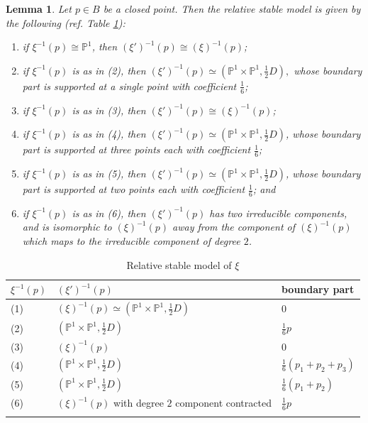 \documentclass[a4paper,12pt]{amsart}
\newcommand{\bP}{{\mathbb P}}
\newtheorem{lemma}[theorem]{Lemma}
\theoremstyle{definition}
\theoremstyle{remark}
\begin{document}
\begin{lemma}\label{lemma_objects_in_the_boundary_when_fibers_have_coef_1_over_18}
    Let $p\in B$ be a closed point. Then the relative stable model is given by the following \textup{(ref. Table \ref{table:Relative stable model})}:
    \begin{enumerate}
        \item if $\xi^{-1}(p)\cong \bP^1$, then $(\xi')^{-1}(p)\cong (\xi)^{-1}(p)$;
        \item if $\xi^{-1}(p)$ is as in (2), then $(\xi')^{-1}(p)\simeq (\bP^1\times \bP^1,\frac{1}{2}D),$ whose boundary part is supported at a single point with coefficient $\frac{1}{6}$;
        \item if $\xi^{-1}(p)$ is as in  (3), then $(\xi')^{-1}(p)\cong (\xi)^{-1}(p)$;
        \item if $\xi^{-1}(p)$ is as in  (4), then $(\xi')^{-1}(p)\simeq (\bP^1\times \bP^1,\frac{1}{2}D)$, whose boundary part is supported at three points each with coefficient $\frac{1}{6}$;
        \item if $\xi^{-1}(p)$ is as in (5), then $(\xi')^{-1}(p)\simeq (\bP^1\times \bP^1,\frac{1}{2}D)$, whose boundary part is supported at two points each with coefficient $\frac{1}{6}$; and
        \item if $\xi^{-1}(p)$ is as in (6), then $(\xi')^{-1}(p)$ has two irreducible components, and is isomorphic to $(\xi)^{-1}(p)$ away from the component of $(\xi)^{-1}(p)$ which maps to the irreducible component of degree $2$.
    \end{enumerate}
    \end{lemma}
    
\begin{center}
\begin{longtable}{| p{} | p{}| p{} |}
    \hline \textbf{$\xi^{-1}(p)$} & \textbf{$(\xi')^{-1}(p)$} & \textbf{boundary part}  \\ \hline
    \hline (1) &  $(\xi)^{-1}(p)\simeq (\bP^1\times\bP^1,\frac{1}{2}D)$ &  0 \\ \hline (2)   &  $(\bP^1\times\bP^1,\frac{1}{2}D)$  & $\frac{1}{6}p$  \\ \hline (3)   & $(\xi)^{-1}(p)$ & 0  \\ \hline (4)   &  $(\bP^1\times\bP^1,\frac{1}{2}D)$ &  $\frac{1}{6}(p_1+p_2+p_3)$ \\ \hline (5)   &  $(\bP^1\times\bP^1,\frac{1}{2}D)$  & $\frac{1}{6}(p_1+p_2)$  \\ \hline (6)   &  $(\xi)^{-1}(p)$ with degree $2$ component contracted  & $\frac{1}{6}p$  \\  \hline
    \caption{Relative stable model of $\xi$}
    \label{table:Relative stable model}  
\end{longtable}
    
\end{center}
\end{document}

